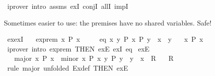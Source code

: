 \begin{isabellebody}
\ {\isacharparenleft}{\kern0pt}iprover\ intro{\isacharcolon}{\kern0pt}\ assms\ exI\ conjI\ allI\ impI{\isacharparenright}{\kern0pt}%
\endisatagproof
{\isafoldproof}%
%
\isadelimproof
%
\endisadelimproof
%
\begin{isamarkuptext}%
Sometimes easier to use: the premises have no shared variables. Safe!%
\end{isamarkuptext}\isamarkuptrue%
\isamarkupfalse%
\ ex{\isacharunderscore}{\kern0pt}ex{}I{\isacharcolon}{\kern0pt}\isanewline
\ \ \ ex{\isacharunderscore}{\kern0pt}prem{\isacharcolon}{\kern0pt}\ {\isachardoublequoteopen}{\isasymexists}x{\isachardot}{\kern0pt}\ P\ x{\isachardoublequoteclose}\isanewline
\ \ \ \ \ eq{\isacharcolon}{\kern0pt}\ {\isachardoublequoteopen}{\isasymAnd}x\ y{\isachardot}{\kern0pt}\ {\isasymlbrakk}P\ x{\isacharsemicolon}{\kern0pt}\ P\ y{\isasymrbrakk}\ {\isasymLongrightarrow}\ x\ {\isacharequal}{\kern0pt}\ y{\isachardoublequoteclose}\isanewline
\ \ \ {\isachardoublequoteopen}{\isasymexists}{\isacharbang}{\kern0pt}x{\isachardot}{\kern0pt}\ P\ x{\isachardoublequoteclose}\isanewline
%
\isadelimproof
\ \ %
\endisadelimproof
%
\isatagproof
{}\isamarkupfalse%
\ {\isacharparenleft}{\kern0pt}iprover\ intro{\isacharcolon}{\kern0pt}\ ex{\isacharunderscore}{\kern0pt}prem\ {\isacharbrackleft}{\kern0pt}THEN\ exE{\isacharbrackright}{\kern0pt}\ ex{}I\ eq{\isacharparenright}{\kern0pt}%
\endisatagproof
{\isafoldproof}%
%
\isadelimproof
\isanewline
%
\endisadelimproof
\isanewline
{}\isamarkupfalse%
\ ex{}E{\isacharcolon}{\kern0pt}\isanewline
\ \ \ major{\isacharcolon}{\kern0pt}\ {\isachardoublequoteopen}{\isasymexists}{\isacharbang}{\kern0pt}x{\isachardot}{\kern0pt}\ P\ x{\isachardoublequoteclose}\ \ minor{\isacharcolon}{\kern0pt}\ {\isachardoublequoteopen}{\isasymAnd}x{\isachardot}{\kern0pt}\ {\isasymlbrakk}P\ x{\isacharsemicolon}{\kern0pt}\ {\isasymforall}y{\isachardot}{\kern0pt}\ P\ y\ {\isasymlongrightarrow}\ y\ {\isacharequal}{\kern0pt}\ x{\isasymrbrakk}\ {\isasymLongrightarrow}\ R{\isachardoublequoteclose}\isanewline
\ \ \ R\isanewline
%
\isadelimproof
%
\endisadelimproof
%
\isatagproof
{}\isamarkupfalse%
\ {\isacharparenleft}{\kern0pt}rule\ major\ {\isacharbrackleft}{\kern0pt}unfolded\ Ex{}{\isacharunderscore}{\kern0pt}def{\isacharcomma}{\kern0pt}\ THEN\ exE{\isacharbrackright}{\kern0pt}{\isacharparenright}{\kern0pt}\isanewline
\ \ \isamarkupfalse%

\end{isabellebody}
